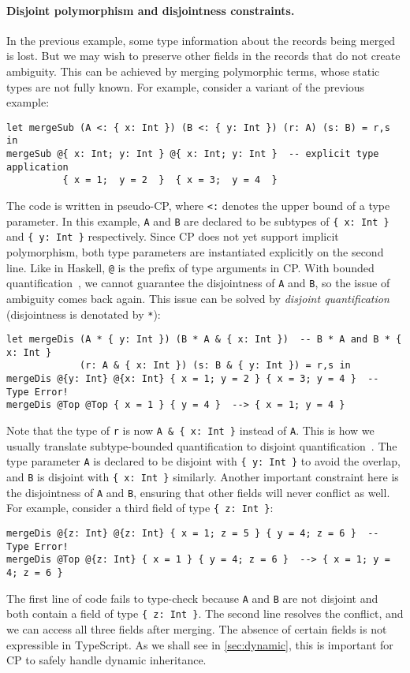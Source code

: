 \paragraph{Disjoint polymorphism and disjointness constraints.}
In the previous example, some type information about the records being merged is
lost. But we may wish to preserve other fields in the records that do not create
ambiguity. This can be achieved by merging polymorphic terms, whose static types
are not fully known. For example, consider a variant of the previous example:
\begin{lstlisting}
let mergeSub (A <: { x: Int }) (B <: { y: Int }) (r: A) (s: B) = r,s in
mergeSub @{ x: Int; y: Int } @{ x: Int; y: Int }  -- explicit type application
          { x = 1;  y = 2  }  { x = 3;  y = 4  }
\end{lstlisting}
The code is written in pseudo-CP, where \lstinline{<:} denotes the upper bound
of a type parameter. In this example, \lstinline{A} and \lstinline{B} are
declared to be subtypes of \lstinline|{ x: Int }| and \lstinline|{ y: Int }|
respectively. Since CP does not yet support implicit polymorphism, both type
parameters are instantiated explicitly on the second line. Like in Haskell,
\lstinline|@| is the prefix of type arguments in CP. With bounded
quantification~\citep{cardelli1985understanding}, we cannot guarantee the
disjointness of \lstinline{A} and \lstinline{B}, so the issue of ambiguity comes
back again. This issue can be solved by \emph{disjoint
quantification}~\citep{alpuim2017disjoint} (disjointness is denotated by
\lstinline{*}):
\begin{lstlisting}
let mergeDis (A * { y: Int }) (B * A & { x: Int })  -- B * A and B * { x: Int }
             (r: A & { x: Int }) (s: B & { y: Int }) = r,s in
mergeDis @{y: Int} @{x: Int} { x = 1; y = 2 } { x = 3; y = 4 }  -- Type Error!
mergeDis @Top @Top { x = 1 } { y = 4 }  --> { x = 1; y = 4 }
\end{lstlisting}
Note that the type of \lstinline{r} is now \lstinline|A & { x: Int }| instead of
\lstinline{A}. This is how we usually translate subtype-bounded quantification
to disjoint quantification~\citep{xie2020row}. The type parameter \lstinline{A}
is declared to be disjoint with \lstinline|{ y: Int }| to avoid the overlap, and
\lstinline{B} is disjoint with \lstinline|{ x: Int }| similarly. Another
important constraint here is the disjointness of \lstinline{A} and
\lstinline{B}, ensuring that other fields will never conflict as well. For
example, consider a third field of type \lstinline|{ z: Int }|:
\begin{lstlisting}
mergeDis @{z: Int} @{z: Int} { x = 1; z = 5 } { y = 4; z = 6 }  -- Type Error!
mergeDis @Top @{z: Int} { x = 1 } { y = 4; z = 6 }  --> { x = 1; y = 4; z = 6 }
\end{lstlisting}
The first line of code fails to type-check because \lstinline{A} and
\lstinline{B} are not disjoint and both contain a field of type
\lstinline|{ z: Int }|. The second line resolves the conflict, and we can access
all three fields after merging. The absence of certain fields is not expressible
in TypeScript. As we shall see in \autoref{sec:dynamic}, this is important for
CP to safely handle dynamic inheritance.

